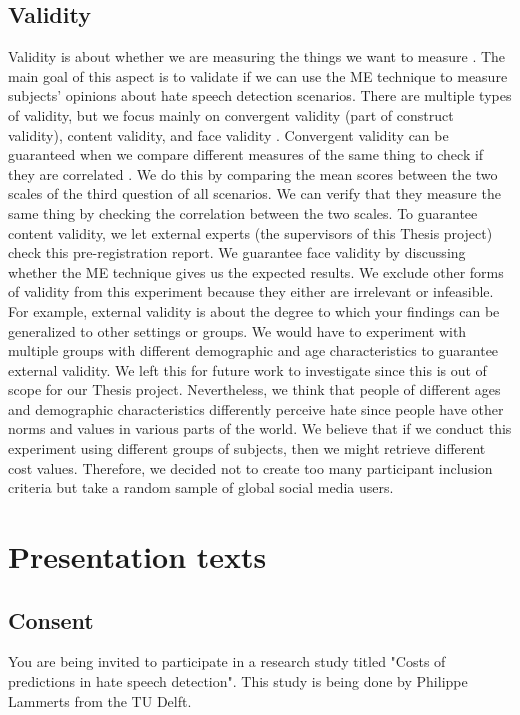 \documentclass[a4paper]{article}
\begin{document}
\subsection{Validity}
Validity is about whether we are measuring the things we want to measure \cite{fitzner2007reliability}. The main goal of this aspect is to validate if we can use the ME technique to measure subjects’ opinions about hate speech detection scenarios. There are multiple types of validity, but we focus mainly on convergent validity (part of construct validity), content validity, and face validity \cite{fitzner2007reliability}. Convergent validity can be guaranteed when we compare different measures of the same thing to check if they are correlated \cite{fitzner2007reliability}. We do this by comparing the mean scores between the two scales of the third question of all scenarios. We can verify that they measure the same thing by checking the correlation between the two scales. To guarantee content validity, we let external experts (the supervisors of this Thesis project) check this pre-registration report. We guarantee face validity by discussing whether the ME technique gives us the expected results. We exclude other forms of validity from this experiment because they either are irrelevant or infeasible. For example, external validity is about the degree to which your findings can be generalized to other settings or groups. We would have to experiment with multiple groups with different demographic and age characteristics to guarantee external validity. We left this for future work to investigate since this is out of scope for our Thesis project. Nevertheless, we think that people of different ages and demographic characteristics differently perceive hate since people have other norms and values in various parts of the world. We believe that if we conduct this experiment using different groups of subjects, then we might retrieve different cost values. Therefore, we decided not to create too many participant inclusion criteria but take a random sample of global social media users.

\appendix
\section{Presentation texts}
\label{sec:appendix}

\subsection{Consent}
You are being invited to participate in a research study titled "Costs of predictions in hate speech detection". This study is being done by Philippe Lammerts from the TU Delft.
\end{document}
